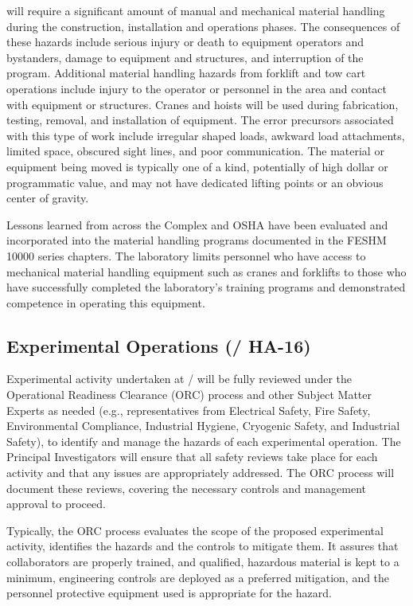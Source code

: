  will require a significant amount of manual and mechanical
material handling during the construction, installation and operations
phases.  The consequences of these hazards include serious injury or
death to equipment operators and bystanders, damage to equipment and
structures, and interruption of the program.  Additional material
handling hazards from forklift and tow cart operations include injury
to the operator or personnel in the area and contact with equipment or
structures. Cranes and hoists will be used during fabrication,
testing, removal, and installation of equipment. The error precursors
associated with this type of work include irregular shaped loads,
awkward load attachments, limited space, obscured sight lines, and
poor communication.  The material or equipment being moved is
typically one of a kind, potentially of high dollar or programmatic
value, and may not have dedicated lifting points or an obvious center
of gravity.

Lessons learned from across the  Complex and OSHA have been
evaluated and incorporated into the \fnal material handling
programs documented in the FESHM 10000 series chapters.  The
laboratory limits personnel who have access to mechanical material
handling equipment such as cranes and forklifts to those who have
successfully completed the laboratory's training programs and
demonstrated competence in operating this equipment.


\subsection{Experimental Operations (/ HA-16)}

Experimental activity undertaken at / will be fully reviewed
under the Operational Readiness Clearance (ORC) process and other
Subject Matter Experts as needed (e.g., representatives from
Electrical Safety, Fire Safety, Environmental Compliance, Industrial
Hygiene, Cryogenic Safety, and Industrial Safety), to identify and
manage the hazards of each experimental operation. The Principal
Investigators  will ensure that all safety reviews take place for each
activity and that any issues are appropriately addressed. The ORC
process will document these reviews, covering the necessary controls
and management approval to proceed.

Typically, the ORC process evaluates the scope of the proposed
experimental activity, identifies the hazards and the controls to
mitigate them. It assures that collaborators are properly trained, and
qualified, hazardous material is kept to a minimum, engineering
controls are deployed as a preferred mitigation, and the personnel
protective equipment used is appropriate for the hazard.

